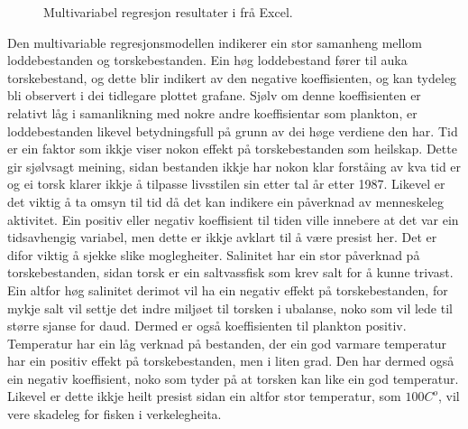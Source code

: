\documentclass{report}
\begin{document}
\begin{figure}[H]
    \centering
    \caption{Multivariabel regresjon resultater i frå Excel.}
    \label{Multi}
\end{figure}
Den multivariable regresjonsmodellen indikerer ein stor samanheng mellom loddebestanden og torskebestanden. Ein høg loddebestand fører til auka torskebestand, og dette blir indikert av den negative koeffisienten, og kan tydeleg bli observert i dei tidlegare plottet grafane. Sjølv om denne koeffisienten er relativt låg i samanlikning med nokre andre koeffisientar som plankton, er loddebestanden likevel betydningsfull på grunn av dei høge verdiene den har.
Tid er ein faktor som ikkje viser nokon effekt på torskebestanden som heilskap. Dette gir sjølvsagt meining, sidan bestanden ikkje har nokon klar forståing av kva tid er og ei torsk klarer ikkje å tilpasse livsstilen sin etter tal år etter 1987. Likevel er det viktig å ta omsyn til tid då det kan indikere ein påverknad av menneskeleg aktivitet. Ein positiv eller negativ koeffisient til tiden ville innebere at det var ein tidsavhengig variabel, men dette er ikkje avklart til å være presist her. Det er difor viktig å sjekke slike moglegheiter.
Salinitet har ein stor påverknad på torskebestanden, sidan torsk er ein saltvassfisk som krev salt for å kunne trivast.
Ein altfor høg salinitet derimot vil ha ein negativ effekt på torskebestanden, for mykje salt vil settje det indre miljøet til torsken i ubalanse, noko som vil lede til større sjanse for daud.
Dermed er også koeffisienten til plankton positiv. Temperatur har ein låg verknad på bestanden, der ein god varmare temperatur har ein positiv effekt på torskebestanden, men i liten grad. Den har dermed også ein negativ koeffisient, noko som tyder på at torsken kan like ein god temperatur. Likevel er dette ikkje heilt presist sidan ein altfor stor temperatur, som $100C^o$, vil vere skadeleg for fisken i verkelegheita.
\end{document}
